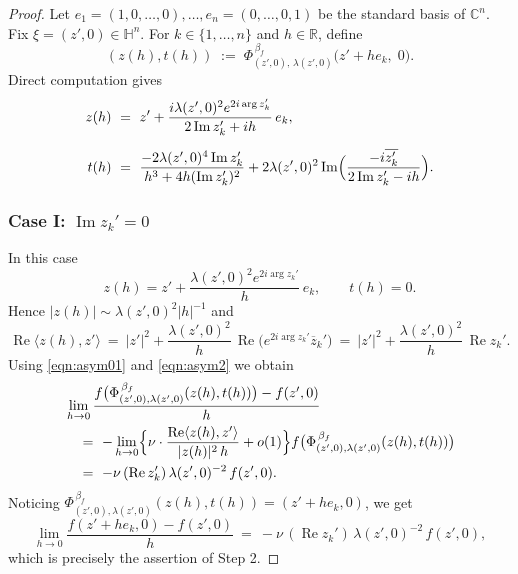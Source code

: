 \documentclass[reqno]{amsart}
\theoremstyle{definition}
\theoremstyle{remark}
\numberwithin{equation}{section}
\begin{document}
\begin{proof}
Let \( e_1 = (1,0,\dots,0), \dots, e_n = (0,\dots,0,1) \) be the standard basis of \( \mathbb{C}^n \).  
Fix \( \xi = (z',0) \in \mathbb{H}^n \). For \( k \in \{1,\dots,n\} \) and \( h \in \mathbb{R} \), define  
\[
(z(h), t(h)) \;:=\; \Phi_{(z',0),\,\lambda(z',0)}^{\, \beta_f} \bigl(z' + h e_k,\; 0\bigr).
\]
Direct computation gives
\begin{align}
z(h) &~=~ z' + \frac{i \lambda(z',0)^2 e^{2i\arg z_k'}}{2 \operatorname{Im} z_k' + i h}\, e_k, \\[2mm]
t(h) &~=~ \frac{-2 \lambda(z',0)^4 \operatorname{Im} z_k'}{h^3 + 4h (\operatorname{Im} z_k')^2}
       + 2 \lambda(z',0)^2 \operatorname{Im} \Bigl(\frac{-i \overline{z_k'}}{2 \operatorname{Im} z_k' - i h}\Bigr).
\end{align}

\subsubsection*{Case I: \( \operatorname{Im} z_k' = 0 \)}
In this case
\[
z(h) = z' + \frac{\lambda(z',0)^2 e^{2i\arg z_k'}}{h}\, e_k ,\qquad t(h) = 0 .
\]
Hence \( |z(h)| \sim \lambda(z',0)^2 |h|^{-1} \) and
\[
\operatorname{Re}\langle z(h), z'\rangle
~=~ |z'|^2 + \frac{\lambda(z',0)^2}{h}\, \operatorname{Re} \bigl(e^{2i\arg z_k'}\overline{z}_k'\bigr)
~=~ |z'|^2 + \frac{\lambda(z',0)^2}{h}\, \operatorname{Re} z_k'.
\]
Using \eqref{eqn:asym01} and \eqref{eqn:asym2} we obtain
\begin{align*}
&\lim_{h\to 0}\frac{f \bigl(\Phi_{(z',0),\lambda(z',0)}^{\, \beta_f} (z(h),t(h))\bigr)-f(z',0)}{h} \\
&\quad =~ -\lim_{h\to0}\Bigl\{\nu\cdot\frac{\operatorname{Re}\langle z(h),z'\rangle}{|z(h)|^{2}\,h}+o(1)\Bigr\}
        f \bigl(\Phi_{(z',0),\lambda(z',0)}^{\, \beta_f} (z(h),t(h))\bigr) \\
&\quad =~ -\nu\,(\operatorname{Re} z_k')\,\lambda(z',0)^{-2}\,f(z',0).
\end{align*}
Noticing $\Phi_{(z',0),\lambda(z',0)}^{\, \beta_f} (z(h),t(h))=(z'+h e_k,0)$, we get
\[
\lim_{h\to0}\frac{f(z'+h e_k,0)-f(z',0)}{h}
~=~ -\nu\,(\operatorname{Re} z_k')\,\lambda(z',0)^{-2}\,f(z',0),
\]
which is precisely the assertion of Step 2.


\end{proof}
\end{document}
